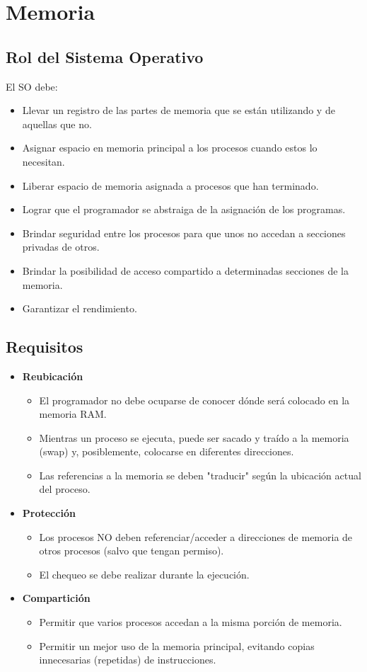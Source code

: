 \section{Memoria}

\subsection{Rol del Sistema Operativo}
El SO debe:
\begin{itemize}
    \item Llevar un registro de las partes de memoria que se están utilizando y de aquellas que no.
    \item Asignar espacio en memoria principal a los procesos cuando estos lo necesitan.
    \item Liberar espacio de memoria asignada a procesos que han terminado.
    \item Lograr que el programador se abstraiga de la asignación de los programas.
    \item Brindar seguridad entre los procesos para que unos no accedan a secciones privadas de otros.
    \item Brindar la posibilidad de acceso compartido a determinadas secciones de la memoria.
    \item Garantizar el rendimiento.
\end{itemize}

\subsection{Requisitos}
\begin{itemize}
    \item \textbf{Reubicación}
    \begin{itemize}
        \item El programador no debe ocuparse de conocer dónde será colocado en la memoria RAM.
        \item Mientras un proceso se ejecuta, puede ser sacado y traído a la memoria (swap) y, posiblemente, colocarse en diferentes direcciones.
        \item Las referencias a la memoria se deben "traducir" según la ubicación actual del proceso.
    \end{itemize}
    \item \textbf{Protección}
    \begin{itemize}
        \item Los procesos NO deben referenciar/acceder a direcciones de memoria de otros procesos (salvo que tengan permiso).
        \item El chequeo se debe realizar durante la ejecución.
    \end{itemize}
\item \textbf{Compartición}
    \begin{itemize}
        \item Permitir que varios procesos accedan a la misma porción de memoria.
        \item Permitir un mejor uso de la memoria principal, evitando copias innecesarias (repetidas) de instrucciones.
    \end{itemize}
\end{itemize}

